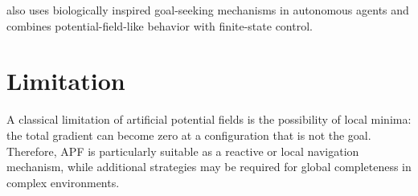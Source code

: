 \documentclass[a4paper]{article}
\begin{document}
      \cite{kerr-2017-biological-goal-seeking} also uses biologically inspired goal-seeking mechanisms in autonomous agents and combines potential-field-like behavior with finite-state control.

   \section{Limitation}
      A classical limitation of artificial potential fields is the possibility of local minima: the total gradient can become zero at a configuration that is not the goal. Therefore, APF is particularly suitable as a reactive or local navigation mechanism, while additional strategies may be required for global completeness in complex environments.

   
   
\end{document}
